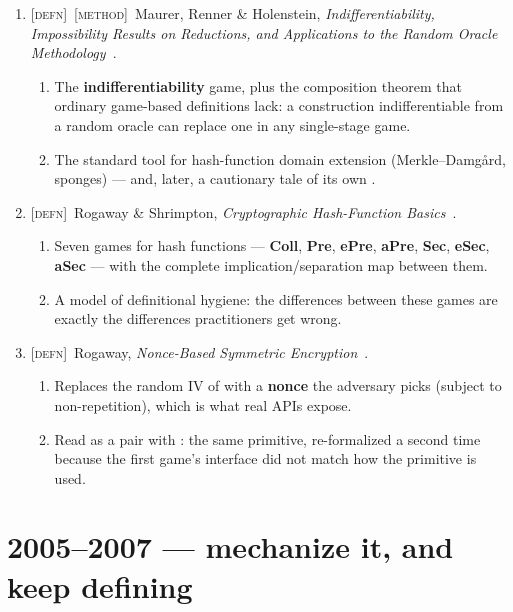 \documentclass[11pt]{article}
\newcommand{\kind}[1]{{\footnotesize\textsc{\textcolor{yearcolor}{[#1]}}}\ }
\newcommand{\defn}{\kind{defn}}
\newcommand{\method}{\kind{method}}
\newcommand{\paper}[3]{#1, \emph{#2}~\cite{#3}.}
\begin{document}
\begin{enumerate}
  \item \defn\method \paper{Maurer, Renner \& Holenstein}{Indifferentiability,
    Impossibility Results on Reductions, and Applications to the Random Oracle
    Methodology}{MRH04}
    \begin{enumerate}
      \item The \textbf{indifferentiability} game, plus the composition theorem
        that ordinary game-based definitions lack: a construction
        indifferentiable from a random oracle can replace one in any
        single-stage game.
      \item The standard tool for hash-function domain extension
        (Merkle--Damg\aa{}rd, sponges) --- and, later, a cautionary tale of its
        own \cite{RSS11}.
    \end{enumerate}

  \item \defn \paper{Rogaway \& Shrimpton}{Cryptographic Hash-Function Basics}
    {RS04}
    \begin{enumerate}
      \item Seven games for hash functions --- \textbf{Coll}, \textbf{Pre},
        \textbf{ePre}, \textbf{aPre}, \textbf{Sec}, \textbf{eSec},
        \textbf{aSec} --- with the complete implication/separation map between
        them.
      \item A model of definitional hygiene: the differences between these games
        are exactly the differences practitioners get wrong.
    \end{enumerate}

  \item \defn \paper{Rogaway}{Nonce-Based Symmetric Encryption}{Rog04}
    \begin{enumerate}
      \item Replaces the random IV of \cite{BDJR97} with a \textbf{nonce} the
        adversary picks (subject to non-repetition), which is what real APIs
        expose.
      \item Read as a pair with \cite{BDJR97}: the same primitive, re-formalized
        a second time because the first game's interface did not match how the
        primitive is used.
    \end{enumerate}
\end{enumerate}

\section{2005--2007 --- mechanize it, and keep defining}
\end{document}
